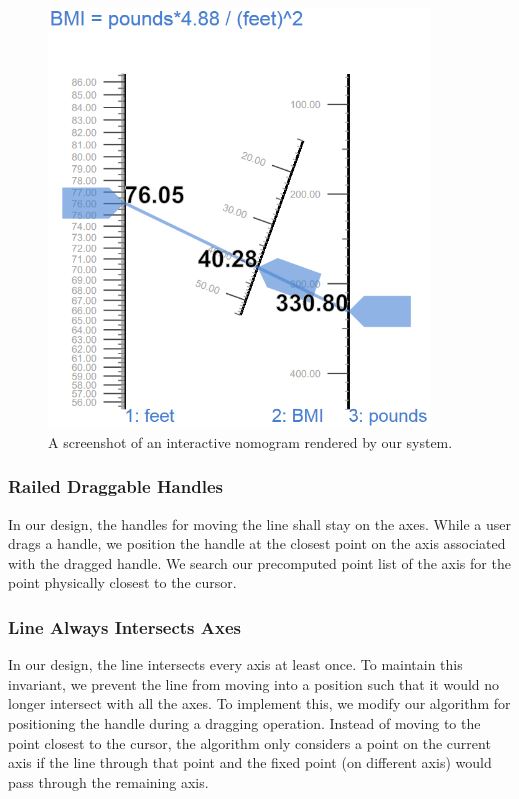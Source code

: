 \documentclass{proc}
\begin{document}
\begin{figure}
\label{fig:bmi-ours}
\begin{center}
\includegraphics[width=0.9\textwidth]{bmi-ours.png}
\caption{A screenshot of an interactive nomogram rendered by our system.}
\end{center}
\end{figure}

\subsubsection{Railed Draggable Handles}
In our design, the handles for moving the line shall stay on the axes.
While a user drags a handle, we position the handle at the closest
point on the axis associated with the dragged handle.
We search our precomputed point list of the axis for the point
physically closest to the cursor.

\subsubsection{Line Always Intersects Axes}
In our design, the line intersects every axis at least once.
To maintain this invariant, we prevent the line from moving into a
position such that it would no longer intersect with all the axes.
To implement this, we modify our algorithm for positioning the handle
during a dragging operation.
Instead of moving to the point closest to the cursor, the algorithm
only considers a point on the current axis if the line through that
point and the fixed point (on different axis) would pass through the
remaining axis.
\end{document}

